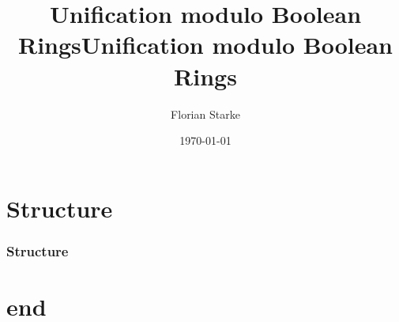 \documentclass{beamer}
\title{Unification modulo\hspace{30pt} Boolean Rings}
\author{Florian	Starke}
\date{\today}
\begin{document}
\maketitle
\addtocounter{framenumber}{-1}
\title{Unification modulo Boolean Rings}

\section*{Structure}
\begin{frame}
\frametitle{Structure}
\tableofcontents 
\end{frame}


\section*{end}
\end{document}
